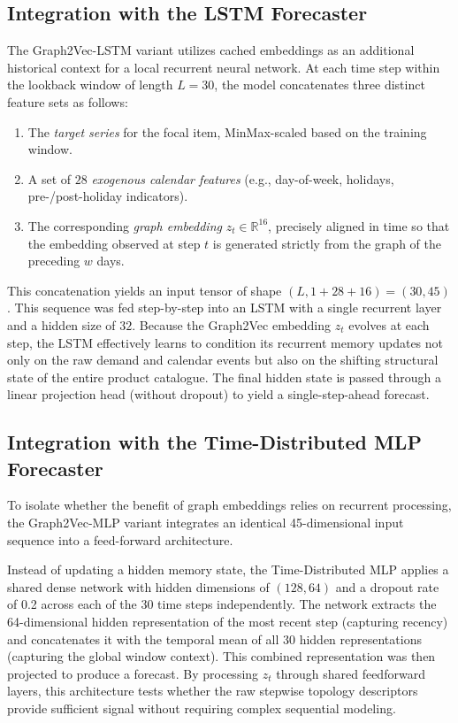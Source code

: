 \subsection{Integration with the LSTM Forecaster}
The Graph2Vec-LSTM variant utilizes cached embeddings as an additional historical context for a local recurrent neural network. At each time step within the lookback window of length \(L=30\), the model concatenates three distinct feature sets as follows:
\begin{enumerate}
    \item The \emph{target series} for the focal item, MinMax-scaled based on the training window.
    \item A set of \(28\) \emph{exogenous calendar features} (e.g., day-of-week, holidays, pre-/post-holiday indicators).
    \item The corresponding \emph{graph embedding} \(z_t \in \mathbb{R}^{16}\), precisely aligned in time so that the embedding observed at step \(t\) is generated strictly from the graph of the preceding \(w\) days.
\end{enumerate}
This concatenation yields an input tensor of shape \((L, 1 + 28 + 16) = (30, 45)\). This sequence was fed step-by-step into an LSTM with a single recurrent layer and a hidden size of \(32\). Because the Graph2Vec embedding \(z_t\) evolves at each step, the LSTM effectively learns to condition its recurrent memory updates not only on the raw demand and calendar events but also on the shifting structural state of the entire product catalogue. The final hidden state is passed through a linear projection head (without dropout) to yield a single-step-ahead forecast.

\subsection{Integration with the Time-Distributed MLP Forecaster}
To isolate whether the benefit of graph embeddings relies on recurrent processing, the Graph2Vec-MLP variant integrates an identical 45-dimensional input sequence into a feed-forward architecture. 

Instead of updating a hidden memory state, the Time-Distributed MLP applies a shared dense network with hidden dimensions of \((128, 64)\) and a dropout rate of 0.2 across each of the 30 time steps independently. The network extracts the 64-dimensional hidden representation of the most recent step (capturing recency) and concatenates it with the temporal mean of all 30 hidden representations (capturing the global window context). This combined representation was then projected to produce a forecast. By processing \(z_t\) through shared feedforward layers, this architecture tests whether the raw stepwise topology descriptors provide sufficient signal without requiring complex sequential modeling.

